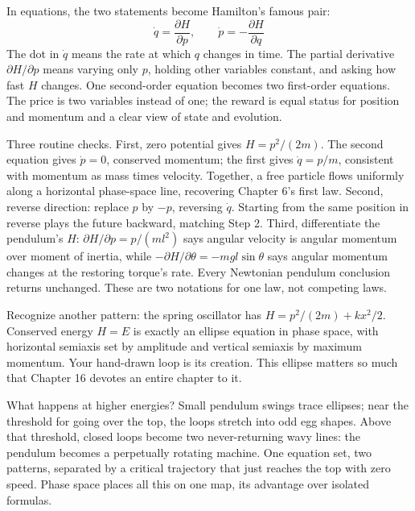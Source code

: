 \begin{mathbridge}
In equations, the two statements become Hamilton's famous pair:
\[
  \dot{q} = \frac{\partial H}{\partial p}, \qquad
  \dot{p} = -\frac{\partial H}{\partial q}
\]
The dot in \(\dot{q}\) means the rate at which \(q\) changes in time. The partial derivative \(\partial H/\partial p\) means varying only \(p\), holding other variables constant, and asking how fast \(H\) changes. One second-order equation becomes two first-order equations. The price is two variables instead of one; the reward is equal status for position and momentum and a clear view of state and evolution.

Three routine checks. First, zero potential gives \(H = p^{2}/(2m)\). The second equation gives \(\dot{p}=0\), conserved momentum; the first gives \(\dot{q}=p/m\), consistent with momentum as mass times velocity. Together, a free particle flows uniformly along a horizontal phase-space line, recovering Chapter 6's first law. Second, reverse direction: replace \(p\) by \(-p\), reversing \(\dot{q}\). Starting from the same position in reverse plays the future backward, matching Step 2. Third, differentiate the pendulum's \(H\): \(\partial H/\partial p = p/(ml^{2})\) says angular velocity is angular momentum over moment of inertia, while \(-\partial H/\partial\theta = -mgl\sin\theta\) says angular momentum changes at the restoring torque's rate. Every Newtonian pendulum conclusion returns unchanged. These are two notations for one law, not competing laws.

Recognize another pattern: the spring oscillator has \(H=p^{2}/(2m)+kx^{2}/2\). Conserved energy \(H=E\) is exactly an ellipse equation in phase space, with horizontal semiaxis set by amplitude and vertical semiaxis by maximum momentum. Your hand-drawn loop is its creation. This ellipse matters so much that Chapter 16 devotes an entire chapter to it.

What happens at higher energies? Small pendulum swings trace ellipses; near the threshold for going over the top, the loops stretch into odd egg shapes. Above that threshold, closed loops become two never-returning wavy lines: the pendulum becomes a perpetually rotating machine. One equation set, two patterns, separated by a critical trajectory that just reaches the top with zero speed. Phase space places all this on one map, its advantage over isolated formulas.
\end{mathbridge}

